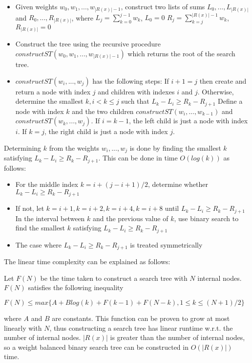 \begin{itemize}
	\item Given weights ${w_0, w_1, ..., w_{|R(x)|-1}}$, construct two lists of sums ${L_0, ..., L_{|R(x)|}}$ and ${R_0, ..., R_{|R(x)|}}$, where
	\subitem $L_j=\sum_{k=0}^{j-1} w_k$, $L_0=0$
	\subitem $R_j=\sum_{k=j}^{|R(x)|-1} w_k$, $R_{|R(x)|}=0$
	\item Construct the tree using the recursive procedure $constructST(w_0, w_1, ..., w_{|R(x)|-1})$ which returns the root of the search tree.
	\item $constructST(w_i, ..., w_j)$ has the following steps:
	\subitem If $i+1=j$ then create and return a node with index $j$ and children with indexes $i$ and $j$.
	\subitem Otherwise, determine the smallest $k, i<k\le j$ such that
	\subsubitem $L_k-L_i \ge R_k-R_{j+1}$
	\subitem Define a node with index $k$ and the two children $constructST(w_i, ..., w_{k-1})$ and $constructST(w_k, ..., w_j)$.
	\subsubitem If $i=k-1$, the left child is just a node with index $i$.
	\subsubitem If $k=j$, the right child is just a node with index $j$.
\end{itemize}

Determining $k$ from the weights ${w_i, ..., w_j}$ is done by finding the smallest $k$ satisfying $L_k-L_i \ge R_k-R_{j+1}$. This can be done in time $O(log(k))$ as follows:

\begin{itemize}
	\item For the middle index $k=i+(j-i+1)/2$, determine whether $L_k-L_i \ge R_k-R_{j+1}$
	\item If not, let $k=i+1, k=i+2, k=i+4, k=i+8$ until $L_k-L_i \ge R_k-R_{j+1}$
	\subitem In the interval between $k$ and the previous value of $k$, use binary search to find the smallest $k$ satisfying $L_k-L_i \ge R_k-R_{j+1}$
	\item The case where $L_k-L_i \ge R_k-R_{j+1}$ is treated symmetrically
\end{itemize}

The linear time complexity can be explained as follows:

Let $F(N)$ be the time taken to construct a search tree with $N$ internal nodes. $F(N)$ satisfies the following inequality

$F(N) \le max\{A + Blog(k) + F(k-1) + F(N-k), 1 \le k \le (N+1)/2\}$

where $A$ and $B$ are constants. This function can be proven to grow at most linearly with $N$, thus constructing a search tree has linear runtime w.r.t. the number of internal nodes.  $|R(x)|$ is greater than the number of internal nodes, so a weight balanced binary search tree can be constructed in $O(|R(x)|)$ time.

